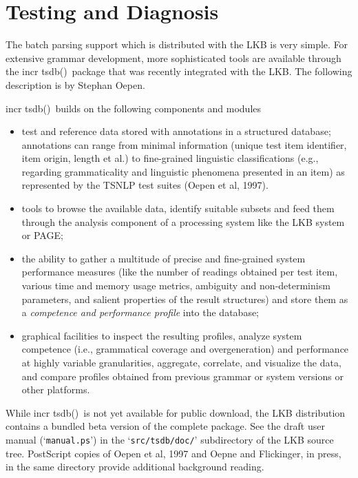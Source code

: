 \documentclass[12pt]{report}
\newcommand{\itsdb}{{\sf \lbrack incr tsdb()\rbrack}}
\begin{document}

\section{Testing and Diagnosis}
\label{tsdb}

The batch parsing support which is distributed with the
LKB is very simple.  For extensive grammar development,
more sophisticated tools
are available through the \itsdb\ package that was recently
integrated with the LKB.  The following description is by Stephan Oepen.

\itsdb\ builds on the following components and modules
\begin{itemize}

\item test and reference data stored with annotations in a structured database;
annotations can range from minimal information (unique test item
identifier, item origin, length et al.) to fine-grained linguistic
classifications (e.g., regarding grammaticality and linguistic
phenomena presented in an item) as represented by the TSNLP test
suites (Oepen et al, 1997).

\item tools to browse the available data, identify suitable subsets and feed
them through the analysis component of a processing system like
the LKB system or PAGE;

\item the ability to gather a multitude of precise and fine-grained system
performance measures (like the number of readings obtained per test
item, various time and memory usage metrics, ambiguity and
non-determinism parameters, and salient properties of the result
structures) and store them as a {\em competence and performance
profile\/} into the database;

\item graphical facilities to inspect the resulting profiles, analyze
system competence (i.e., grammatical coverage and
overgeneration) and performance at highly variable
granularities, aggregate, correlate, and visualize the data,
and compare profiles obtained from previous grammar or system
versions or other platforms.
\end{itemize}

While \itsdb\ is not yet available for public download, the LKB
distribution contains a bundled beta version of the complete
package.  See the draft user manual (`{\tt manual.ps}') in the
`{\tt src/tsdb/doc/}' subdirectory of the LKB source tree.
PostScript copies of Oepen et al, 1997 and Oepne and Flickinger, in press, in
the same directory provide additional background reading.
\end{document}
